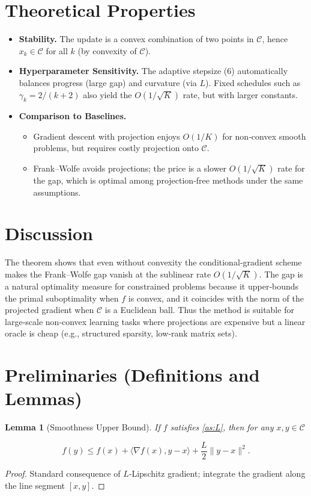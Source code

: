 \documentclass{article}
\newtheorem{lemma}{Lemma}
\begin{document}
\section*{Theoretical Properties}
\begin{itemize}
  \item \textbf{Stability.} The update is a convex combination of two points in $\mathcal C$, hence $x_{k}\in\mathcal C$ for all $k$ (by convexity of $\mathcal C$).
  \item \textbf{Hyperparameter Sensitivity.} The adaptive stepsize (6) automatically balances progress (large gap) and curvature (via $L$). Fixed schedules such as $\gamma_{k}=2/(k+2)$ also yield the $O(1/\sqrt{K})$ rate, but with larger constants.
  \item \textbf{Comparison to Baselines.}
    \begin{itemize}
      \item Gradient descent with projection enjoys $O(1/K)$ for non‑convex smooth problems, but requires costly projection onto $\mathcal C$.
      \item Frank–Wolfe avoids projections; the price is a slower $O(1/\sqrt{K})$ rate for the gap, which is optimal among projection‑free methods under the same assumptions.
    \end{itemize}
\end{itemize}
\section*{Discussion}
The theorem shows that even without convexity the conditional‑gradient scheme makes the Frank–Wolfe gap vanish at the sublinear rate $O(1/\sqrt{K})$.  The gap is a natural optimality measure for constrained problems because it upper‑bounds the primal suboptimality when $f$ is convex, and it coincides with the norm of the projected gradient when $\mathcal C$ is a Euclidean ball.  Thus the method is suitable for large‑scale non‑convex learning tasks where projections are expensive but a linear oracle is cheap (e.g., structured sparsity, low‑rank matrix sets).

\section*{Preliminaries (Definitions and Lemmas)}
\begin{lemma}[Smoothness Upper Bound]\label{lem:smooth}
If $f$ satisfies \ref{as:L}, then for any $x,y\in\mathcal C$

\[
f(y)\le f(x)+\langle\nabla f(x),y-x\rangle+\frac{L}{2}\|y-x\|^{2}.
\tag{8}
\]
\end{lemma}
\begin{proof}
Standard consequence of $L$‑Lipschitz gradient; integrate the gradient along the line segment $[x,y]$.
\end{proof}
\end{document}

